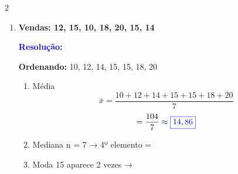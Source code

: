 \documentclass[11pt]{article}
\newcommand{\respostaNum}[1]{\textcolor{blue}{\boxed{#1}}}
\newcommand{\resolucao}{\textbf{\textcolor{blue}{Resolução:}}}
\begin{document}
\begin{multicols}{2}
\begin{enumerate}[leftmargin=*, start=7]
\item \textbf{Vendas: 12, 15, 10, 18, 20, 15, 14}

\resolucao

\textbf{Ordenando:} 10, 12, 14, 15, 15, 18, 20

\begin{enumerate}[label=\alph*)]
\item Média
\[\bar{x} = \frac{10+12+14+15+15+18+20}{7} \]
\[= \frac{104}{7} \approx \respostaNum{14,86} \]

\item Mediana
n = 7 → 4º elemento = \respostaNum{15}

\item Moda
15 aparece 2 vezes → \respostaNum{15}
\end{enumerate}

\end{enumerate}

\end{multicols}
\end{document}
